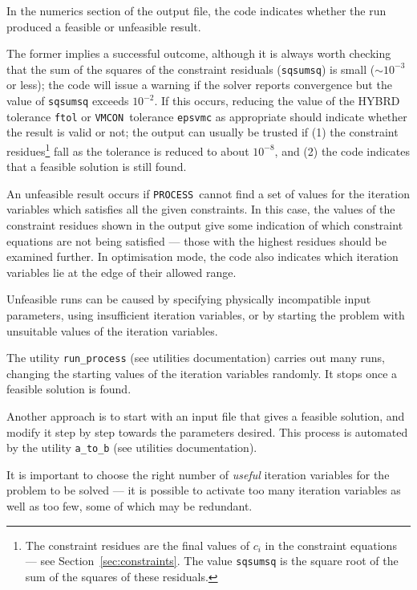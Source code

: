 \documentclass[11pt,a4paper]{report}
\newcommand{\process}{\mbox{\texttt{PROCESS}}}
\newcommand{\vmcon}{\mbox{\texttt{VMCON}}}
\begin{document}
In the numerics section of the output file, the code indicates whether the run
produced a feasible or unfeasible result.

The former implies a successful outcome, although it is always worth checking
that the sum of the squares of the constraint residuals (\texttt{sqsumsq}) is small ($\sim
10^{-3}$ or less); the code will issue a warning if the solver reports convergence but
the value of \texttt{sqsumsq} exceeds $10^{-2}$. If this occurs, reducing the
value of the HYBRD tolerance \texttt{ftol} or \vmcon\ tolerance
\texttt{epsvmc} as appropriate should indicate whether the result is valid
or not; the output can usually be trusted if (1) the constraint
residues\footnote{The constraint residues are the final values of $c_i$ in the
  constraint equations --- see Section~\ref{sec:constraints}. The value
  \texttt{sqsumsq} is the square root of the sum of the squares of these
  residuals.} fall as the tolerance is reduced to about $10^{-8}$, and (2) the
code indicates that a feasible solution is still found.

An unfeasible result occurs if \process\ cannot find a set of values for the
iteration variables which satisfies all the given constraints. In this case,
the values of the constraint residues shown in the output give some indication
of which constraint equations are not being satisfied --- those with the
highest residues should be examined further. In optimisation mode, the code
also indicates which iteration variables lie at the edge of their allowed
range.

Unfeasible runs can be caused by specifying physically incompatible input parameters,  using insufficient iteration variables, or by starting the problem with unsuitable values of the iteration variables.

The utility \texttt{run\_process} (see utilities documentation) carries out many runs, changing the starting values of the iteration variables randomly.  It stops once a feasible solution is found.

Another approach is to start with an input file that gives a feasible solution, and modify it step by step towards the parameters desired.  This process is automated by the
utility \texttt{a\_to\_b} (see utilities documentation).

It is important to choose the right number of \textit{useful}\/ iteration variables for the
problem to be solved --- it is possible to activate too many iteration variables as well as too few, some of which may be redundant.
\end{document}
